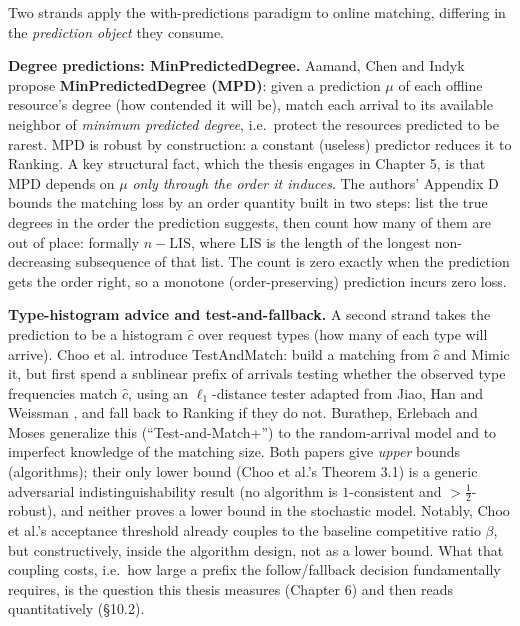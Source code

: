 Two strands apply the with-predictions paradigm to online matching,
differing in the \emph{prediction object} they consume.

\textbf{Degree predictions: MinPredictedDegree.} Aamand, Chen and Indyk
\autocite{aci2022mpd} propose \textbf{MinPredictedDegree (MPD)}: given a
prediction \(\mu\) of each offline resource's degree (how contended it
will be), match each arrival to its available neighbor of \emph{minimum
predicted degree}, i.e.~protect the resources predicted to be rarest.
MPD is robust by construction: a constant (useless) predictor reduces it
to Ranking. A key structural fact, which the thesis engages in Chapter
5, is that MPD depends on \(\mu\) \emph{only through the order it
induces}. The authors' Appendix D bounds the matching loss by an order
quantity built in two steps: list the true degrees in the order the
prediction suggests, then count how many of them are out of place:
formally \(n-\mathrm{LIS}\), where \(\mathrm{LIS}\) is the length of the
longest non-decreasing subsequence of that list. The count is zero
exactly when the prediction gets the order right, so a monotone
(order-preserving) prediction incurs zero loss.

\textbf{Type-histogram advice and test-and-fallback.} A second strand
takes the prediction to be a histogram \(\hat c\) over request types
(how many of each type will arrive). Choo et al.
\autocite{choo2024imperfect} introduce TestAndMatch: build a matching
from \(\hat c\) and Mimic it, but first spend a sublinear prefix of
arrivals testing whether the observed type frequencies match \(\hat c\),
using an \(\ell_1\)-distance tester adapted from Jiao, Han and Weissman
\autocite{jiao2018l1}, and fall back to Ranking if they do not.
Burathep, Erlebach and Moses \autocite{bem2026testmatch} generalize this
(``Test-and-Match+'') to the random-arrival model and to imperfect
knowledge of the matching size. Both papers give \emph{upper} bounds
(algorithms); their only lower bound (Choo et al.'s Theorem 3.1) is a
generic adversarial indistinguishability result (no algorithm is
\(1\)-consistent and \(>\tfrac12\)-robust), and neither proves a lower
bound in the stochastic model. Notably, Choo et al.'s acceptance
threshold already couples to the baseline competitive ratio \(\beta\),
but constructively, inside the algorithm design, not as a lower bound.
What that coupling costs, i.e.~how large a prefix the follow/fallback
decision fundamentally requires, is the question this thesis measures
(Chapter 6) and then reads quantitatively (§10.2).

